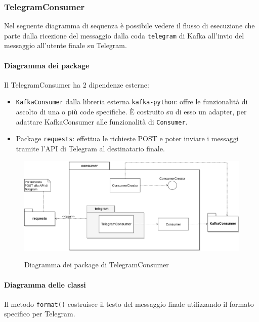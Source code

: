 \subsubsection{TelegramConsumer}
Nel seguente diagramma di sequenza è possibile vedere il flusso di esecuzione che parte dalla ricezione del messaggio dalla coda \texttt{telegram}
di Kafka all'invio del messaggio all'utente finale su Telegram.

\paragraph{Diagramma dei package}

Il TelegramConsumer ha 2 dipendenze esterne:
\begin{itemize}
    \item \texttt{KafkaConsumer} dalla libreria esterna \texttt{kafka-python}: offre le funzionalità di ascolto
        di una o più code specifiche. È costruito su di esso un adapter, per adattare KafkaConsumer alle funzionalità
        di \texttt{Consumer}.
    \item Package \texttt{requests}: effettua le richieste POST e poter inviare i messaggi tramite l'API di Telegram
        al destinatario finale.
\end{itemize}

\begin{figure}[H]
    \centering
    \includegraphics[width=\textwidth]{img/Package-TelegramConsumer.png}\\
    \caption{Diagramma dei package di TelegramConsumer}
\end{figure}

\paragraph{Diagramma delle classi}

Il metodo \texttt{format()} costruisce il testo del messaggio finale utilizzando il formato  specifico per Telegram.

